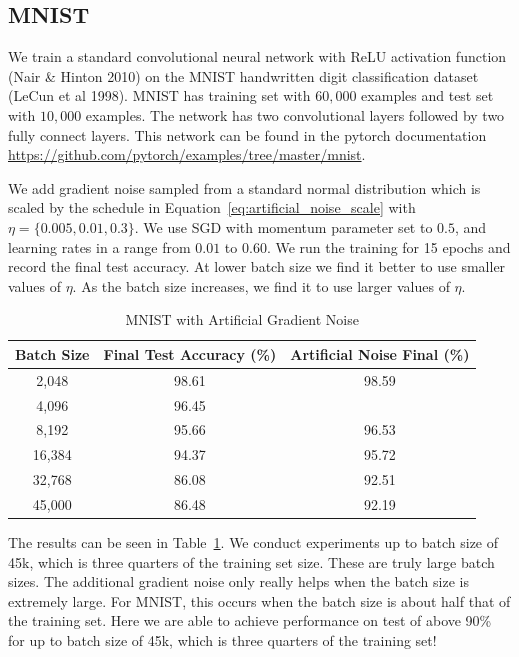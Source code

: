 \documentclass{article} %
\begin{document}
\subsection{MNIST}
We train a standard convolutional neural network with ReLU activation function (Nair \& Hinton 2010) on the MNIST handwritten digit classification dataset (LeCun et al 1998).
MNIST has training set with $60,000$ examples and test set with $10,000$ examples.
The network has two convolutional layers followed by two fully connect layers.
This network can be found in the pytorch documentation \url{https://github.com/pytorch/examples/tree/master/mnist}.

We add gradient noise sampled from a standard normal distribution which is scaled by the schedule in Equation~\ref{eq:artificial_noise_scale} with $\eta = \{ 0.005, 0.01, 0.3 \}$.
We use SGD with momentum parameter set to $0.5$, and learning rates in a range from $0.01$ to $0.60$.
We run the training for 15 epochs and record the final test accuracy.
At lower batch size we find it better to use smaller values of $\eta$.
As the batch size increases, we find it to use larger values of $\eta$.

\begin{table}[h]
\label{tab:mnist_noise}
\begin{center}
\begin{tabular}{ c c c}
 Batch Size & Final Test Accuracy (\%) & Artificial Noise Final (\%) \\ 
 \hline
 2,048 & 98.61 & 98.59 \\
 4,096 & 96.45 &  \\
 8,192 & 95.66 & 96.53 \\
 16,384 & 94.37 & 95.72 \\  
 32,768 & 86.08 & 92.51 \\
 45,000 & 86.48 & 92.19
\end{tabular}
\end{center}
\caption{MNIST with Artificial Gradient Noise}
\end{table}

The results can be seen in Table~\ref{tab:mnist_noise}. 
We conduct experiments up to batch size of 45k, which is three quarters of the training set size.
These are truly large batch sizes.
The additional gradient noise only really helps when the batch size is extremely large.
For MNIST, this occurs when the batch size is about half that of the training set.
Here we are able to achieve performance on test of above 90\% for up to batch size of 45k, which is three quarters of the training set!
\end{document}
